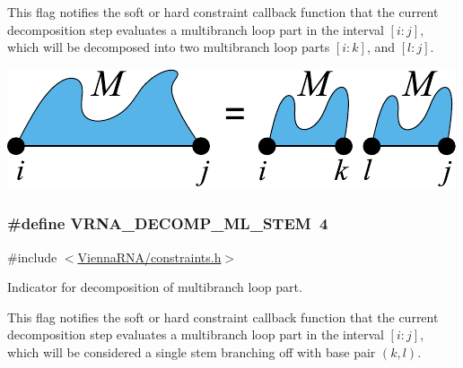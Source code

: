 This flag notifies the soft or hard constraint callback function that the current decomposition step evaluates a multibranch loop part in the interval $[i:j]$, which will be decomposed into two multibranch loop parts $[i:k]$, and $[l:j]$.

 
\begin{DoxyImageNoCaption}
  \mbox{\includegraphics[width=\textwidth,height=\textheight/2,keepaspectratio=true]{decomp_ml_ml_ml}}
\end{DoxyImageNoCaption}
\subsubsection[{\texorpdfstring{V\+R\+N\+A\+\_\+\+D\+E\+C\+O\+M\+P\+\_\+\+M\+L\+\_\+\+S\+T\+EM}{VRNA_DECOMP_ML_STEM}}]{\setlength{\rightskip}{0pt plus 5cm}\#define V\+R\+N\+A\+\_\+\+D\+E\+C\+O\+M\+P\+\_\+\+M\+L\+\_\+\+S\+T\+EM~4}\hypertarget{group__constraints_ga4a23054c75d8efc785de50e3ea87602f}{}\label{group__constraints_ga4a23054c75d8efc785de50e3ea87602f}


{\ttfamily \#include $<$\hyperlink{constraints_8h}{Vienna\+R\+N\+A/constraints.\+h}$>$}



Indicator for decomposition of multibranch loop part. 

This flag notifies the soft or hard constraint callback function that the current decomposition step evaluates a multibranch loop part in the interval $[i:j]$, which will be considered a single stem branching off with base pair $(k,l)$.

